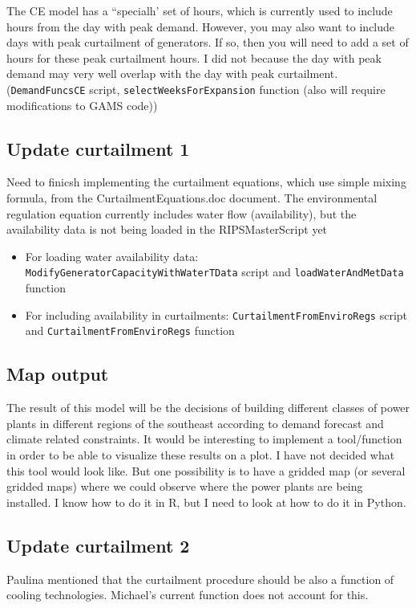 \documentclass[11pt, oneside]{article}   	%
\begin{document}
The CE model has a ``specialh' set of hours, which is currently used to include hours from the day with peak demand. However, you may also want to include days with peak curtailment of generators. If so, then you will need to add a set of hours for these peak curtailment hours. I did not because the day with peak demand may very well overlap with the day with peak curtailment. (\texttt{DemandFuncsCE} script, \texttt{selectWeeksForExpansion} function (also will require modifications to GAMS code))

\subsection{Update curtailment 1}

Need to finicsh implementing the curtailment equations, which use simple mixing formula, from the CurtailmentEquations.doc document. The environmental regulation equation currently includes water flow (availability), but the availability data is not being loaded in the RIPSMasterScript yet

\begin{itemize}
\item For loading water availability data: \texttt{ModifyGeneratorCapacityWithWaterTData} script and \texttt{loadWaterAndMetData} function
\item For including availability in curtailments: \texttt{CurtailmentFromEnviroRegs} script and \texttt{CurtailmentFromEnviroRegs} function
\end{itemize}

\subsection{Map output}

The result of this model will be the decisions of building different classes of power plants in different regions of the southeast according to demand forecast and climate related constraints. It would be interesting to implement a tool/function in order to be able to visualize these results on a plot. I have not decided what this tool would look like. But one possibility is to have a gridded map (or several gridded maps) where we could observe where the power plants are being installed. I know how to do it in R, but I need to look at how to do it in Python.

\subsection{Update curtailment 2}
Paulina mentioned that the curtailment procedure should be also a function of cooling technologies. Michael's current function does not account for this.
\end{document}

